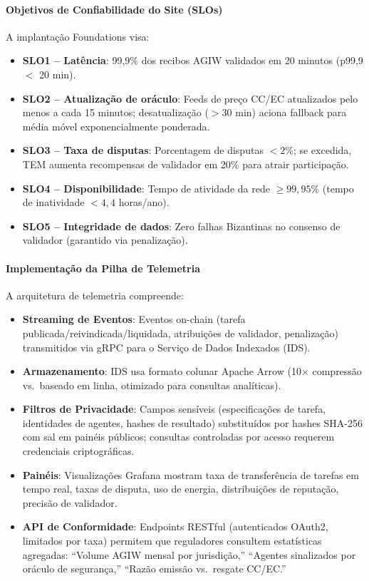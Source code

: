 \documentclass[11pt]{article}
\begin{document}
\paragraph{Objetivos de Confiabilidade do Site (SLOs)} A implantação Foundations visa:
\begin{itemize}[noitemsep]
  \item \textbf{SLO1 -- Latência}: 99,9\% dos recibos AGIW validados em 20 minutos (p99,9 $<$ 20 min).
  \item \textbf{SLO2 -- Atualização de oráculo}: Feeds de preço CC/EC atualizados pelo menos a cada 15 minutos; desatualização ($>30$ min) aciona fallback para média móvel exponencialmente ponderada.
  \item \textbf{SLO3 -- Taxa de disputas}: Porcentagem de disputas $<2\%$; se excedida, TEM aumenta recompensas de validador em 20\% para atrair participação.
  \item \textbf{SLO4 -- Disponibilidade}: Tempo de atividade da rede $\geq 99,95\%$ (tempo de inatividade $<4,4$ horas/ano).
  \item \textbf{SLO5 -- Integridade de dados}: Zero falhas Bizantinas no consenso de validador (garantido via penalização).
\end{itemize}

\paragraph{Implementação da Pilha de Telemetria} A arquitetura de telemetria compreende:
\begin{itemize}[noitemsep]
  \item \textbf{Streaming de Eventos}: Eventos on-chain (tarefa publicada/reivindicada/liquidada, atribuições de validador, penalização) transmitidos via gRPC para o Serviço de Dados Indexados (IDS).
  \item \textbf{Armazenamento}: IDS usa formato colunar Apache Arrow (10$\times$ compressão vs.\ baseado em linha, otimizado para consultas analíticas).
  \item \textbf{Filtros de Privacidade}: Campos sensíveis (especificações de tarefa, identidades de agentes, hashes de resultado) substituídos por hashes SHA-256 com sal em painéis públicos; consultas controladas por acesso requerem credenciais criptográficas.
  \item \textbf{Painéis}: Visualizações Grafana mostram taxa de transferência de tarefas em tempo real, taxas de disputa, uso de energia, distribuições de reputação, precisão de validador.
  \item \textbf{API de Conformidade}: Endpoints RESTful (autenticados OAuth2, limitados por taxa) permitem que reguladores consultem estatísticas agregadas: ``Volume AGIW mensal por jurisdição,'' ``Agentes sinalizados por oráculo de segurança,'' ``Razão emissão vs.\ resgate CC/EC.''
\end{itemize}
\end{document}
